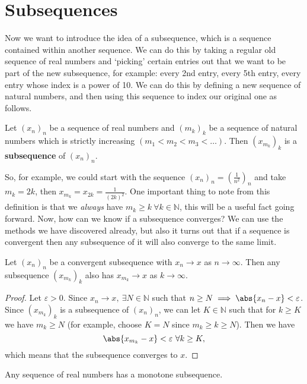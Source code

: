 \documentclass[../real_analysis.tex]{subfiles}
\begin{document}
    \section{Subsequences}
        Now we want to introduce the idea of a subsequence, which is a sequence contained within another sequence. We can do this by taking a regular old sequence of real numbers and `picking' certain entries out that we want to be part of the new subsequence, for example: every 2nd entry, every 5th entry, every entry whose index is a power of 10. We can do this by defining a new sequence of natural numbers, and then using this sequence to index our original one as follows.
        \begin{definition}
            Let $(x_n)_n$ be a sequence of real numbers and $(m_k)_k$ be a sequence of natural numbers which is strictly increasing $(m_1<m_2<m_3<\dots)$. Then $(x_{m_k})_k$ is a \textbf{subsequence} of $(x_n)_n$.
        \end{definition}
        So, for example, we could start with the sequence $(x_n)_n=\left(\frac{1}{n^2}\right)_n$ and take $m_k=2k$, then $x_{m_k}=x_{2k}=\frac{1}{(2k)^2}$. One important thing to note from this definition is that we \textit{always} have $m_k\geq k\ \forall k\in\mathbb{N}$, this will be a useful fact going forward. Now, how can we know if a subsequence converges? We can use the methods we have discovered already, but also it turns out that if a sequence is convergent then any subsequence of it will also converge to the same limit.
        \begin{theorem}
            Let $(x_n)_n$ be a convergent subsequence with $x_n\to x$ as $n\to\infty$. Then any subsequence $(x_{m_k})_k$ also has $x_{m_k}\to x$ as $k\to\infty$.
        \end{theorem}
        \begin{proof}
            Let $\varepsilon>0$. Since $x_n\to x,\ \exists N\in\mathbb{N}$ such that $n\geq N\implies\abs{x_n-x}<\varepsilon$. Since $(x_{m_k})_k$ is a subsequence of $(x_n)_n$, we can let $K\in\mathbb{N}$ such that for $k\geq K$ we have $m_k\geq N$ (for example, choose $K=N$ since $m_k\geq k\geq N$). Then we have
            \begin{equation}
                \abs{x_{m_k}-x}<\varepsilon\ \forall k\geq K,
            \end{equation}
            which means that the subsequence converges to $x$.
        \end{proof}
        \begin{theorem}\label{MST}
            Any sequence of real numbers has a monotone subsequence.
        \end{theorem}
\end{document}
